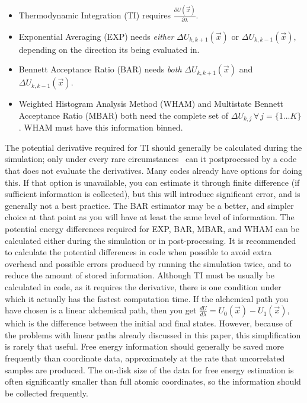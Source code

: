 \documentclass[9pt,bestpractices]{livecoms}
\begin{document}
\begin{itemize}
    \item Thermodynamic Integration (TI) requires $\frac{\partial U(\vec{x})}{\partial\lambda}$.
    \item Exponential Averaging (EXP) needs \textit{either} $\Delta U_{k,k+1}(\vec{x})$ or $\Delta U_{k,k-1}(\vec{x})$, depending on the direction its being evaluated in.
    \item Bennett Acceptance Ratio (BAR) needs \textit{both} $\Delta U_{k,k+1}(\vec{x})$ and $\Delta U_{k,k-1}(\vec{x})$.
    \item Weighted Histogram Analysis Method (WHAM) and Multistate Bennett Acceptance Ratio (MBAR) both need the complete set of $\Delta U_{k,j} \, \forall \, j=\{1...K\}$. WHAM must have this information binned.
\end{itemize}
%
The potential derivative required for TI should generally be calculated during the simulation; only under every rare circumstances~\cite{naden2015linear} can it postprocessed by a code that does not evaluate the derivatives. Many codes already have options for doing this.
If that option is unavailable, you can estimate it through finite difference (if sufficient information is collected), but this  will introduce significant error, and is generally not a best practice. The BAR estimator may be a better, and simpler choice at that point as you will have at least the same level of information. 
The potential energy differences required for EXP, BAR, MBAR, and WHAM can be calculated either during the simulation or in post-processing. It is recommended to calculate the potential differences in code when possible to avoid extra overhead and possible errors produced by running the simulation twice, and to reduce the amount of stored information. 
Although TI must be usually be calculated in code, as it requires the derivative, there is one condition under which it actually has the fastest computation time. 
If the alchemical path you have chosen is a linear alchemical path, then you get $\frac{dU}{d\lambda} = U_0(\vec{x}) - U_1(\vec{x})$, which is the difference between the initial and final states. 
However, because of the problems with linear paths already discussed in this paper, this simplification is rarely that useful.
%
Free energy information should generally be saved more frequently than coordinate data, approximately at the rate that uncorrelated samples are produced.  
The on-disk size of the data for free energy estimation is often significantly smaller than full atomic coordinates, so the information should be collected frequently. 
\end{document}
